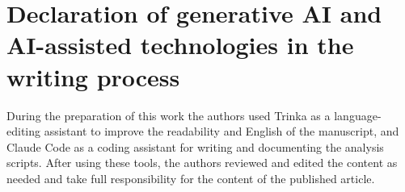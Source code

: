 \section*{Declaration of generative AI and AI-assisted technologies in the writing process}
During the preparation of this work the authors used Trinka as a language-editing assistant to improve the readability and English of the manuscript, and Claude Code as a coding assistant for writing and documenting the analysis scripts. After using these tools, the authors reviewed and edited the content as needed and take full responsibility for the content of the published article.
